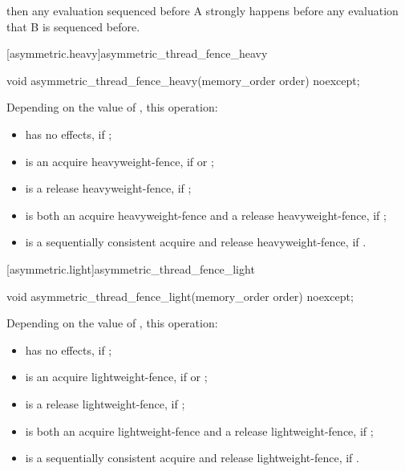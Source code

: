 then any evaluation sequenced before A strongly happens before any evaluation that B is
sequenced before.


[asymmetric.heavy]{asymmetric_thread_fence_heavy}
\begin{itemdecl}
void asymmetric_thread_fence_heavy(memory_order order) noexcept;
\end{itemdecl}

\begin{itemdescr}


\pnum
\effects
Depending on the value of , this operation:
\begin{itemize}
    \item  has no effects, if ;
\item  is an acquire heavyweight-fence, if  or ;
\item is a release heavyweight-fence, if ;
\item is both an acquire heavyweight-fence and a release heavyweight-fence, if ;
\item is a sequentially consistent acquire and release heavyweight-fence, if .
\end{itemize}

\end{itemdescr}

[asymmetric.light]{asymmetric_thread_fence_light}
\begin{itemdecl}
void asymmetric_thread_fence_light(memory_order order) noexcept;
\end{itemdecl}

\begin{itemdescr}


\pnum
\effects
Depending on the value of , this operation:
\begin{itemize}
    \item  has no effects, if ;
\item  is an acquire lightweight-fence, if  or ;
\item is a release lightweight-fence, if ;
\item is both an acquire lightweight-fence and a release lightweight-fence, if ;
\item is a sequentially consistent acquire and release lightweight-fence, if .
\end{itemize}

\end{itemdescr}



